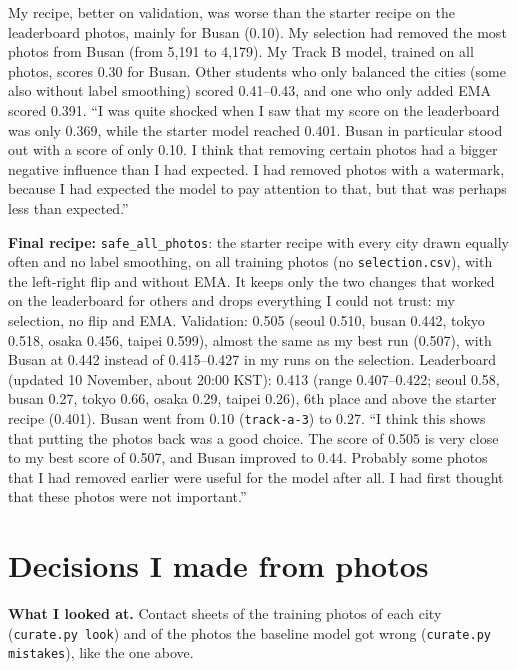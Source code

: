 \documentclass[11pt]{article}
\begin{document}
My recipe, better on validation, was worse than the starter recipe on the
leaderboard photos, mainly for Busan (0.10). My selection had removed the
most photos from Busan (from 5,191 to 4,179). My Track B model, trained on all
photos, scores 0.30 for Busan. Other students who only balanced the cities
(some also without label smoothing) scored 0.41--0.43, and one who only added
EMA scored 0.391.
``I was quite shocked when I saw that my score on the leaderboard was only 0.369, while the starter model reached 0.401. Busan in particular stood out with a score of only 0.10. I think that removing certain photos had a bigger negative influence than I had expected. I had removed photos with a watermark, because I had expected the model to pay attention to that, but that was perhaps less than expected.''

\textbf{Final recipe:} \texttt{safe\_all\_photos}: the starter recipe with every
city drawn equally often and no label smoothing, on all training photos (no
\texttt{selection.csv}), with the left-right flip and without EMA. It keeps only
the two changes that worked on the leaderboard for others and drops everything
I could not trust: my selection, no flip and EMA.
Validation: 0.505 (seoul 0.510, busan 0.442, tokyo 0.518, osaka 0.456,
taipei 0.599), almost the same as my best run (0.507), with Busan at 0.442
instead of 0.415--0.427 in my runs on the selection. Leaderboard (updated
10 November, about 20:00 KST): 0.413 (range 0.407--0.422; seoul 0.58, busan 0.27,
tokyo 0.66, osaka 0.29, taipei 0.26), 6th place and above the starter recipe
(0.401). Busan went from 0.10 (\texttt{track-a-3}) to 0.27.
``I think this shows that putting the photos back was a good choice. The score of 0.505 is very close to my best score of 0.507, and Busan improved to 0.44. Probably some photos that I had removed earlier were useful for the model after all. I had first thought that these photos were not important.''

\section*{Decisions I made from photos}


\textbf{What I looked at.} Contact sheets of the training photos of each city
(\texttt{curate.py look}) and of the photos the baseline model got wrong
(\texttt{curate.py mistakes}), like the one above.
\end{document}
